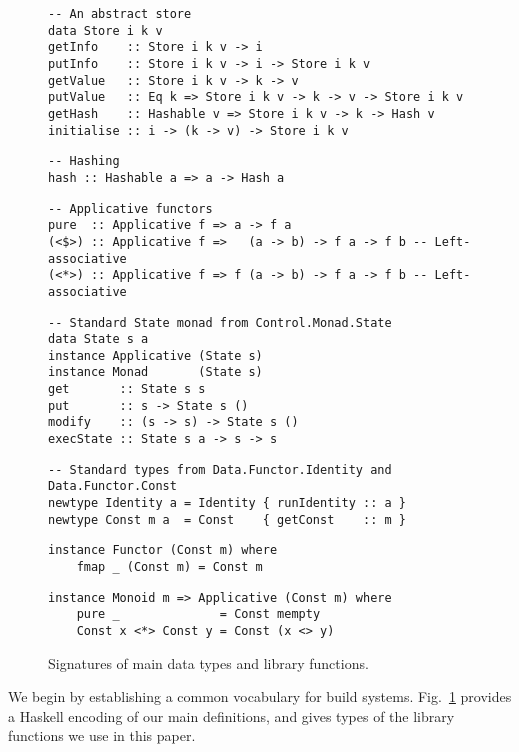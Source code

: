 \begin{figure}
\begin{verbatim}
-- An abstract store
data Store i k v
getInfo    :: Store i k v -> i
putInfo    :: Store i k v -> i -> Store i k v
getValue   :: Store i k v -> k -> v
putValue   :: Eq k => Store i k v -> k -> v -> Store i k v
getHash    :: Hashable v => Store i k v -> k -> Hash v
initialise :: i -> (k -> v) -> Store i k v
\end{verbatim}
\vspace{1mm}
\begin{verbatim}
-- Hashing
hash :: Hashable a => a -> Hash a
\end{verbatim}
\vspace{1mm}
\begin{verbatim}
-- Applicative functors
pure  :: Applicative f => a -> f a
(<$>) :: Applicative f =>   (a -> b) -> f a -> f b -- Left-associative
(<*>) :: Applicative f => f (a -> b) -> f a -> f b -- Left-associative
\end{verbatim}
\vspace{1mm}
\begin{verbatim}
-- Standard State monad from Control.Monad.State
data State s a
instance Applicative (State s)
instance Monad       (State s)
get       :: State s s
put       :: s -> State s ()
modify    :: (s -> s) -> State s ()
execState :: State s a -> s -> s
\end{verbatim}
\vspace{1mm}
\begin{verbatim}
-- Standard types from Data.Functor.Identity and Data.Functor.Const
newtype Identity a = Identity { runIdentity :: a }
newtype Const m a  = Const    { getConst    :: m }
\end{verbatim}
\vspace{0.5mm}
\begin{verbatim}
instance Functor (Const m) where
    fmap _ (Const m) = Const m
\end{verbatim}
\vspace{0.5mm}
\begin{verbatim}
instance Monoid m => Applicative (Const m) where
    pure _              = Const mempty
    Const x <*> Const y = Const (x <> y)
\end{verbatim}
\vspace{-3mm}
\caption{Signatures of main data types and library functions.}\label{fig-types}
\vspace{-4mm}
\end{figure}
We begin by establishing a common vocabulary for build systems.
Fig.~\ref{fig-types} provides a Haskell encoding of our main definitions,
and gives types of the library functions we use in this paper.


